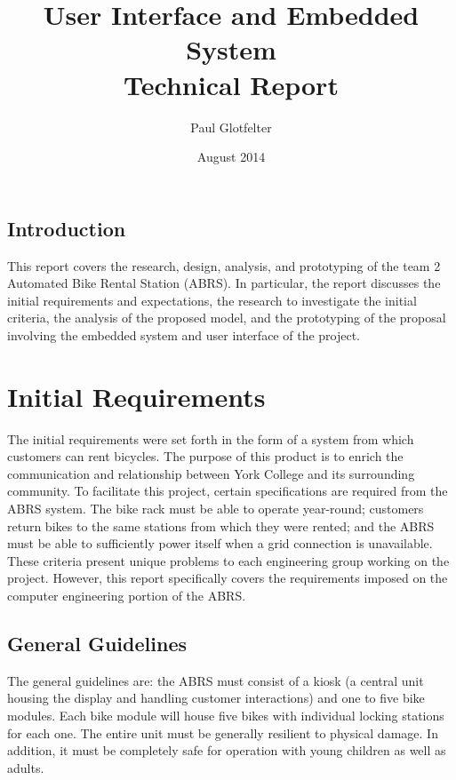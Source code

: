 \documentclass[11pt,a4paper,onesides]{report}
\begin{document}
\title{User Interface and Embedded System  \\ Technical Report}
\author{Paul Glotfelter}
\date{August 2014}

\maketitle

\tableofcontents


\renewcommand{\chaptername}{Section}

\section*{Introduction}

This report covers the research, design, analysis, and prototyping of the team 2 Automated Bike Rental Station (ABRS).  In particular, the report discusses the initial requirements and expectations, the research to investigate the initial criteria, the analysis of the proposed model, and the prototyping of the proposal involving the embedded system and user interface of the project.  

\chapter{Initial Requirements}

The initial requirements were set forth in the form of a system from which customers can rent bicycles.  The purpose of this product is to enrich the communication and relationship between York College and its surrounding community.  To facilitate this project, certain specifications are required from the ABRS system.  The bike rack must be able to operate year-round; customers return bikes to the same stations from which they were rented; and the ABRS must be able to sufficiently power itself when a grid connection is unavailable.  These criteria present unique problems to each engineering group working on the project.  However, this report specifically covers the requirements imposed on the computer engineering portion of the ABRS.  

\section{General Guidelines}
\label{sec:general-guidelines}

The general guidelines are: the ABRS must consist of a kiosk (a central unit housing the display and handling customer interactions) and one to five bike modules.  Each bike module will house five bikes with individual locking stations for each one.  The entire unit must be generally resilient to physical damage.  In addition, it must be completely safe for operation with young children as well as adults.    
\end{document}
